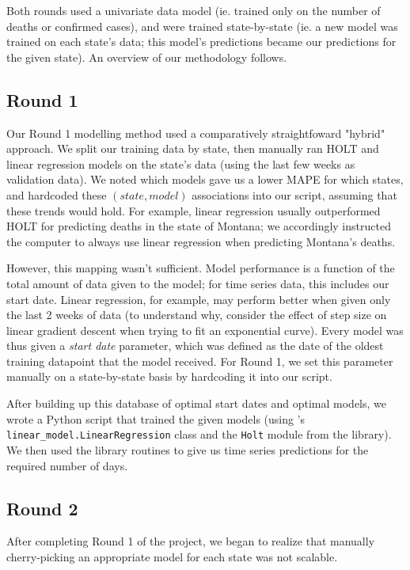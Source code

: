 \documentclass[sigconf,nonacm]{acmart}
\begin{document}
Both rounds used a univariate data model (ie. trained only on the number of
deaths or confirmed cases), and were trained state-by-state (ie. a new model
was trained on each state's data; this model's predictions became our
predictions for the given state). An overview of our methodology follows. 

\subsection{Round 1}

Our Round 1 modelling method used a comparatively straightfoward "hybrid"
approach. We split our training data by state, then manually ran HOLT and
linear regression models on the state's data (using the last few weeks as
validation data). We noted which models gave us a lower MAPE for which states,
and hardcoded these $(state, model)$ associations into our script, assuming
that these trends would hold. For example, linear regression usually
outperformed HOLT for predicting deaths in the state of Montana; we accordingly
instructed the computer to always use linear regression when predicting
Montana's deaths. 

However, this mapping wasn't sufficient. 
Model performance is a function of the total amount of data given to the model;
for time series data, this includes our start date. Linear regression, for
example, may perform better when given only the last 2 weeks of data (to
understand why, consider the effect of step size on linear gradient descent
when trying to fit an exponential curve). 
Every model was thus given a \emph{start date} parameter, which was defined as
the date of the oldest training datapoint that the model received. 
For Round 1, we set this parameter manually on a state-by-state basis by
hardcoding it into our script. 

After building up this database of optimal start dates and optimal models, we
wrote a Python script that trained the given models (using \cite{scikit-learn}'s
\texttt{linear\_model.LinearRegression} class and the \texttt{Holt} module from
the \cite{statsmodels} library). We then used the library routines to give us
time series predictions for the required number of days. 

\subsection{Round 2}

After completing Round 1 of the project, we began to realize that manually
cherry-picking an appropriate model for each state was not scalable. 
\end{document}
